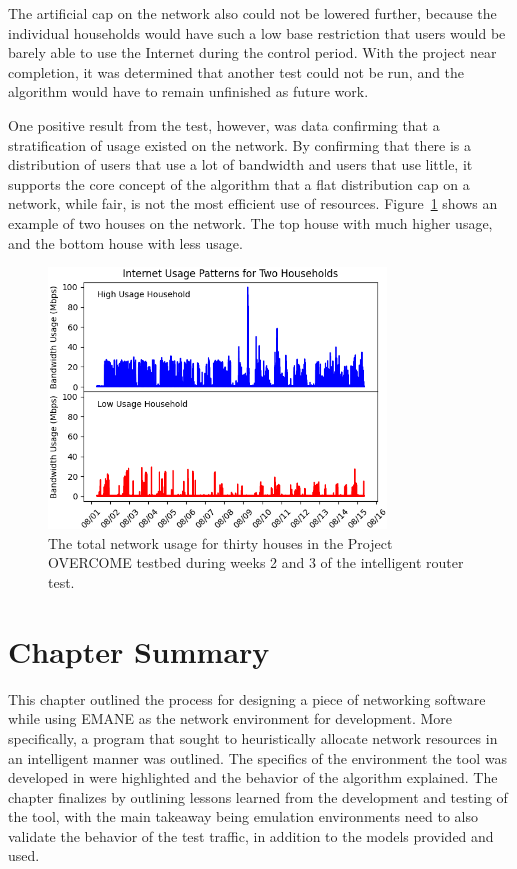 The artificial cap on the network also could not be lowered further, because the individual households would have such a low base restriction that users would be barely able to use the Internet during the control period.
With the project near completion, it was determined that another test could not be run, and the algorithm would have to remain unfinished as future work.\par
One positive result from the test, however, was data confirming that a stratification of usage existed on the network.
By confirming that there is a distribution of users that use a lot of bandwidth and users that use little, it supports the core concept of the algorithm that a flat distribution cap on a network, while fair, is not the most efficient use of resources.
Figure~\ref{usage_compare} shows an example of two houses on the network. The top house with much higher usage, and the bottom house with less usage.
\begin{figure}[!ht]
    \centering
    \includegraphics[width=0.8\textwidth,keepaspectratio]{Images/Chpt4/Network_Compare.png}
    \caption{The total network usage for thirty houses in the Project OVERCOME testbed during weeks 2 and 3 of the intelligent router test.}
    \label{usage_compare}
\end{figure}

\section{Chapter Summary}
This chapter outlined the process for designing a piece of networking software while using EMANE as the network environment for development.
More specifically, a program that sought to heuristically allocate network resources in an intelligent manner was outlined.
The specifics of the environment the tool was developed in were highlighted and the behavior of the algorithm explained.
The chapter finalizes by outlining lessons learned from the development and testing of the tool, with the main takeaway being emulation environments need to also validate the behavior of the test traffic, in addition to the models provided and used.